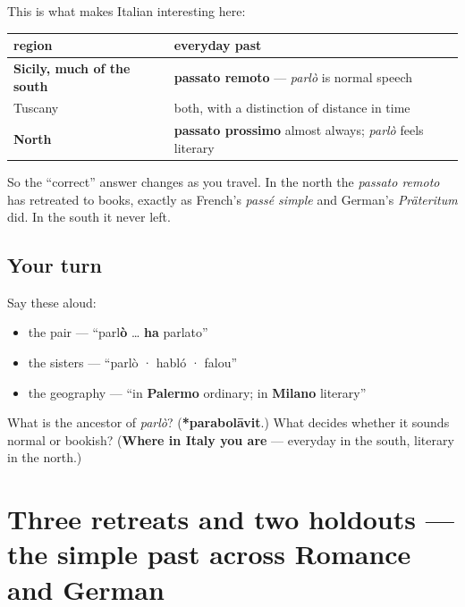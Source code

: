 \begin{culture}
This is what makes Italian interesting here:

\noindent
\begin{tabularx}{\linewidth}{@{}>{\raggedright\arraybackslash}X>{\raggedright\arraybackslash}X@{}}
\toprule
\textbf{region} & \textbf{everyday past} \\
\midrule
\textbf{Sicily, much of the south} & \textbf{passato remoto} — \emph{parlò} is normal speech \\
Tuscany & both, with a distinction of distance in time \\
\textbf{North} & \textbf{passato prossimo} almost always; \emph{parlò} feels literary \\
\bottomrule
\end{tabularx}

So the \textquotedblleft{}correct\textquotedblright{} answer changes as you travel. In the north the \emph{passato remoto} has retreated to books, exactly as French's \emph{passé simple} and German's \emph{Präteritum} did. In the south it never left.
\end{culture}

\subsection*{Your turn}
Say these aloud:

\begin{itemize}
\raggedright
  \item the pair — \textquotedblleft{}parl\textbf{ò} … \textbf{ha} parlato\textquotedblright{}
  \item the sisters — \textquotedblleft{}parlò · habló · falou\textquotedblright{}
  \item the geography — \textquotedblleft{}in \textbf{Palermo} ordinary; in \textbf{Milano} literary\textquotedblright{}
\end{itemize}

\begin{tcolorbox}[breakable,colback=teal!4,colframe=teal!35!black,title={Before you move on}]
What is the ancestor of \emph{parlò}? (\textbf{*parabolāvit}.) What decides whether it sounds normal or bookish? (\textbf{Where in Italy you are} — everyday in the south, literary in the north.)
\end{tcolorbox}
\section[(three retreats and two holdouts)]{Three retreats and two holdouts — the simple past across Romance and German}

